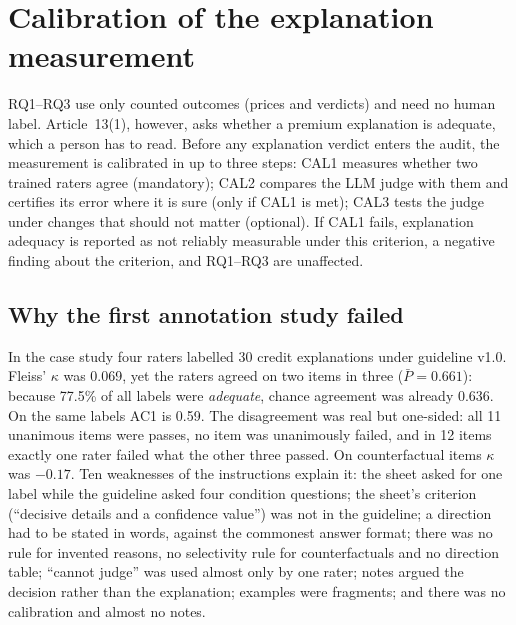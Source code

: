 \section{Calibration of the explanation measurement}
\label{sec:annotation}
RQ1--RQ3 use only counted outcomes (prices and verdicts) and need no human label. Article~13(1), however, asks whether a premium explanation is adequate, which a person has to read. Before any explanation verdict enters the audit, the measurement is calibrated in up to three steps: CAL1 measures whether two trained raters agree (mandatory); CAL2 compares the LLM judge with them and certifies its error where it is sure (only if CAL1 is met); CAL3 tests the judge under changes that should not matter (optional). If CAL1 fails, explanation adequacy is reported as not reliably measurable under this criterion, a negative finding about the criterion, and RQ1--RQ3 are unaffected.

\subsection{Why the first annotation study failed}
In the case study four raters labelled 30 credit explanations under guideline v1.0. Fleiss' $\kappa$ was 0.069, yet the raters agreed on two items in three ($\bar P=0.661$): because 77.5\% of all labels were \emph{adequate}, chance agreement was already 0.636. On the same labels AC1 is 0.59. The disagreement was real but one-sided: all 11 unanimous items were passes, no item was unanimously failed, and in 12 items exactly one rater failed what the other three passed. On counterfactual items $\kappa$ was $-0.17$. Ten weaknesses of the instructions explain it: the sheet asked for one label while the guideline asked four condition questions; the sheet's criterion (``decisive details and a confidence value'') was not in the guideline; a direction had to be stated in words, against the commonest answer format; there was no rule for invented reasons, no selectivity rule for counterfactuals and no direction table; ``cannot judge'' was used almost only by one rater; notes argued the decision rather than the explanation; examples were fragments; and there was no calibration and almost no notes.

